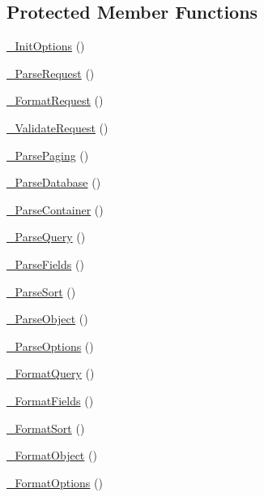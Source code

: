 \subsection*{Protected Member Functions}
\begin{DoxyCompactItemize}
\item 
\hyperlink{class_c_data_wrapper_a85c97add738d08f2f2a9958ffbda6c03}{\-\_\-\-Init\-Options} ()
\item 
\hyperlink{class_c_data_wrapper_a8b42bd195d9ec6b38ef8e0df3f5dba7a}{\-\_\-\-Parse\-Request} ()
\item 
\hyperlink{class_c_data_wrapper_ab46c0e9797e8636ca1c9d535b377b90a}{\-\_\-\-Format\-Request} ()
\item 
\hyperlink{class_c_data_wrapper_aed059c9ffcb6e988633ba5b28a875b76}{\-\_\-\-Validate\-Request} ()
\item 
\hyperlink{class_c_data_wrapper_a3a0153df5d8c9e29e53d5060b78de785}{\-\_\-\-Parse\-Paging} ()
\item 
\hyperlink{class_c_data_wrapper_afdf0880393aff6f06b29a03245bed4a5}{\-\_\-\-Parse\-Database} ()
\item 
\hyperlink{class_c_data_wrapper_a7f0f78bd3a8528562275fb6cbb2f161d}{\-\_\-\-Parse\-Container} ()
\item 
\hyperlink{class_c_data_wrapper_a3b0852a34c7e36ae691fa6afdfe78856}{\-\_\-\-Parse\-Query} ()
\item 
\hyperlink{class_c_data_wrapper_aea29d199dc406381b85260ec2179aa16}{\-\_\-\-Parse\-Fields} ()
\item 
\hyperlink{class_c_data_wrapper_a73cd0698e6eb033bf5500be06d3c9814}{\-\_\-\-Parse\-Sort} ()
\item 
\hyperlink{class_c_data_wrapper_ab8f321158c05c2db991c35fa43b7b652}{\-\_\-\-Parse\-Object} ()
\item 
\hyperlink{class_c_data_wrapper_a7d02707497013c19b13cbbe5bd6be8b3}{\-\_\-\-Parse\-Options} ()
\item 
\hyperlink{class_c_data_wrapper_a0c3054fcf3716d638922cd581d5c706e}{\-\_\-\-Format\-Query} ()
\item 
\hyperlink{class_c_data_wrapper_a32f71d08b69799b48dc341bc2e9e998f}{\-\_\-\-Format\-Fields} ()
\item 
\hyperlink{class_c_data_wrapper_a040ed6e140436322b736744740cc8cbd}{\-\_\-\-Format\-Sort} ()
\item 
\hyperlink{class_c_data_wrapper_addefb7bd419de62bfebedc21abbdad7e}{\-\_\-\-Format\-Object} ()
\item 
\hyperlink{class_c_data_wrapper_a42bf6e7d0710dac687ca4c5d40983b5f}{\-\_\-\-Format\-Options} ()

\end{DoxyCompactItemize}
